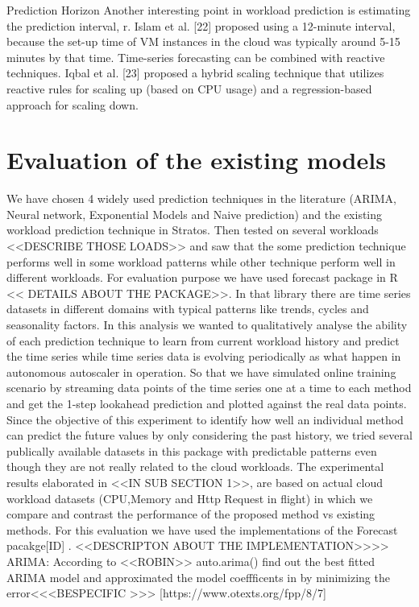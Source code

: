 Prediction Horizon
Another interesting point in workload prediction is estimating the prediction interval, r. Islam et al. [22] proposed using a 12-minute interval, because the set-up time of VM instances in the cloud was typically around 5-15 minutes by that time. Time-series forecasting can be combined with reactive techniques. Iqbal et al. [23] proposed a hybrid scaling technique that utilizes reactive rules for scaling up (based on CPU usage) and a regression-based approach for scaling down.

\section{Evaluation of the existing models}

We have chosen 4 widely used prediction techniques in the literature (ARIMA, Neural network, Exponential Models and Naive prediction) and the existing workload prediction technique in Stratos. Then tested on several workloads <<DESCRIBE THOSE LOADS>> and saw that the some prediction technique performs well in some workload patterns while other technique perform well in different workloads.
For evaluation purpose we have used forecast package in R << DETAILS ABOUT THE PACKAGE>>. In that library there are time series datasets in different domains with typical patterns like trends, cycles and seasonality factors. In this analysis we wanted to qualitatively analyse the ability of each prediction technique to learn from current workload history and predict the time series while time series data is evolving periodically as what happen in autonomous autoscaler in operation. So that we have simulated online training scenario by streaming data points of the time series one at a time to each method and get the 1-step lookahead prediction and plotted against the real data points. Since the objective of this experiment to identify  how well an individual method can predict the future values by only considering the past history, we tried several publically available datasets in this package with predictable patterns even though they are not really related to the cloud workloads. The experimental results elaborated in <<IN SUB SECTION 1>>, are based on actual cloud workload datasets (CPU,Memory and Http Request in flight)  in which we  compare and contrast the performance of the proposed method vs existing methods. 
For this evaluation we have used the implementations of the Forecast pacakge[ID] . <<DESCRIPTON ABOUT THE IMPLEMENTATION>>>>
ARIMA: According to <<ROBIN>> auto.arima()  find out the best fitted ARIMA model and approximated the model coeffficents in by minimizing the error<<<BESPECIFIC >>> [https://www.otexts.org/fpp/8/7]

